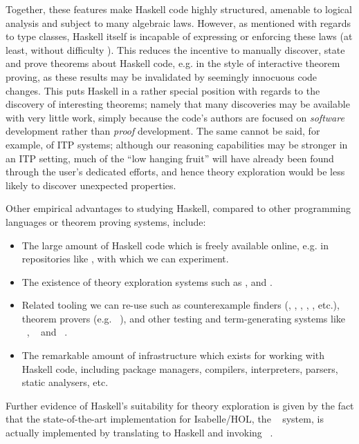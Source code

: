 Together, these features make Haskell code highly structured, amenable to
logical analysis and subject to many algebraic laws. However, as mentioned with
regards to type classes, Haskell itself is incapable of expressing or enforcing
these laws (at least, without difficulty \cite{lindley2014hasochism}). This
reduces the incentive to manually discover, state and prove theorems about
Haskell code, e.g. in the style of interactive theorem proving, as these results
may be invalidated by seemingly innocuous code changes. This puts Haskell in a
rather special position with regards to the discovery of interesting theorems;
namely that many discoveries may be available with very little work, simply
because the code's authors are focused on \emph{software} development rather
than \emph{proof} development. The same cannot be said, for example, of ITP
systems; although our reasoning capabilities may be stronger in an ITP setting,
much of the ``low hanging fruit'' will have already been found through the
user's dedicated efforts, and hence theory exploration would be less likely to
discover unexpected properties.

Other empirical advantages to studying Haskell, compared to other programming
languages or theorem proving systems, include:

\begin{itemize}
\item The large amount of Haskell code which is freely available online, e.g. in
  repositories like \hackage{}, with which we
  can experiment.

\item The existence of theory exploration systems such as \hipspec{},
  \quickspec{} and \speculate{}.

\item Related tooling we can re-use such as counterexample finders (\quickcheck{},
  \smallcheck{}, \smartcheck{}, \leancheck{},
  \hedgehog{}, etc.), theorem provers
  (e.g. \hip{}~\cite{rosen2012proving}), and other testing and
  term-generating systems like \mucheck{}~\cite{le2014mucheck},
  \magichaskeller{}~\cite{katayama2011magichaskeller} and
  \djinn{}~\cite{augustsson2005djinn}.

\item The remarkable amount of infrastructure which exists for working with
  Haskell code, including package managers, compilers, interpreters, parsers,
  static analysers, etc.
\end{itemize}

Further evidence of Haskell's suitability for theory exploration is given by the
fact that the state-of-the-art implementation for Isabelle/HOL, the
\hipster{}~\cite{Hipster} system, is actually implemented by translating
to Haskell and invoking \hipspec{}~\cite{claessen2013automating}.
